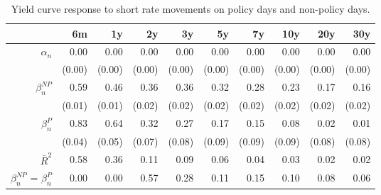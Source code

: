 \begin{table}[ht]
\centering
\caption{Yield curve response to short rate movements on policy days and non-policy days.} 
\label{tab:NPvsPdays}
\begin{tabular}{rrrrrrrrrr}
  \toprule
  & 6m & 1y & 2y & 3y & 5y & 7y & 10y & 20y & 30y \\ 
  \midrule
$\alpha_n$ & 0.00 & 0.00 & 0.00 & 0.00 & 0.00 & 0.00 & 0.00 & 0.00 & 0.00 \\ 
   & (0.00) & (0.00) & (0.00) & (0.00) & (0.00) & (0.00) & (0.00) & (0.00) & (0.00) \\ 
  $\beta_n^{NP}$ & 0.59 & 0.46 & 0.36 & 0.36 & 0.32 & 0.28 & 0.23 & 0.17 & 0.16 \\ 
   & (0.01) & (0.01) & (0.02) & (0.02) & (0.02) & (0.02) & (0.02) & (0.02) & (0.02) \\ 
  $\beta_n^P$ & 0.83 & 0.64 & 0.32 & 0.27 & 0.17 & 0.15 & 0.08 & 0.02 & 0.01 \\ 
   & (0.04) & (0.05) & (0.07) & (0.08) & (0.09) & (0.09) & (0.09) & (0.08) & (0.08) \\ 
  $\bar{R}^2$ & 0.58 & 0.36 & 0.11 & 0.09 & 0.06 & 0.04 & 0.03 & 0.02 & 0.02 \\ 
  $\beta_n^{NP}$ = $\beta_n^P$ & 0.00 & 0.00 & 0.57 & 0.28 & 0.11 & 0.15 & 0.10 & 0.08 & 0.06 \\ 
   \bottomrule
\end{tabular}
\end{table}
